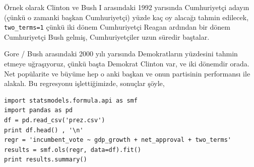 \documentclass[12pt,fleqn]{article}\usepackage{../../common}
\begin{document}
Örnek olarak Clinton ve Bush I arasındaki 1992 yarısında Cumhuriyetçi adayın
(çünkü o zamanki başkan Cumhuriyetçi) yüzde kaç oy alacağı tahmin edilecek,
\verb!two_terms=1! çünkü iki dönem Cumhuriyetçi Reagan ardından bir dönem
Cumhuriyetçi Bush gelmiş, Cumhuriyetçiler uzun süredir baştalar.

Gore / Bush arasındaki 2000 yılı yarısında Demokratların yüzdesini tahmin etmeye
uğraşıyoruz, çünkü başta Demokrat Clinton var, ve iki dönemdir orada. Net
popülarite ve büyüme hep o anki başkan ve onun partisinin performansı ile
alakalı. Bu regresyonu işlettiğimizde, sonuçlar şöyle,

\begin{verbatim} 
import statsmodels.formula.api as smf
import pandas as pd
df = pd.read_csv('prez.csv')
print df.head() , '\n'
regr = 'incumbent_vote ~ gdp_growth + net_approval + two_terms'
results = smf.ols(regr, data=df).fit()
print results.summary()
\end{verbatim}
\end{document}
